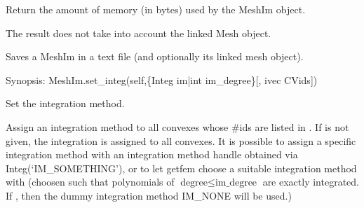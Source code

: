 \documentclass[a4paper,11pt,english]{sphinxmanual}
\begin{document}
\begin{fulllineitems}

\begin{fulllineitems}
\label{\detokenize{python/cmdref_MeshIm:getfem.MeshIm.memsize}}
Return the amount of memory (in bytes) used by the MeshIm object.

The result does not take into account the linked Mesh object.

\end{fulllineitems}


\begin{fulllineitems}
\label{\detokenize{python/cmdref_MeshIm:getfem.MeshIm.save}}
Saves a MeshIm in a text file (and optionally its linked mesh object).

\end{fulllineitems}


\begin{fulllineitems}
\label{\detokenize{python/cmdref_MeshIm:getfem.MeshIm.set_integ}}
Synopsis: MeshIm.set\_integ(self,\{Integ im|int im\_degree\}{[}, ivec CVids{]})

Set the integration method.

Assign an integration method to all convexes whose \#ids are
listed in . If  is not given, the integration is
assigned to all convexes. It is possible to assign a specific
integration method with an integration method handle  obtained
via Integ(‘IM\_SOMETHING’), or to let getfem choose a suitable
integration method with  (choosen such that polynomials
of \(\text{degree} \leq \text{im\_degree}\) are exactly integrated.
If , then the dummy integration method IM\_NONE will 
be used.)

\end{fulllineitems}


\end{fulllineitems}
\end{document}
